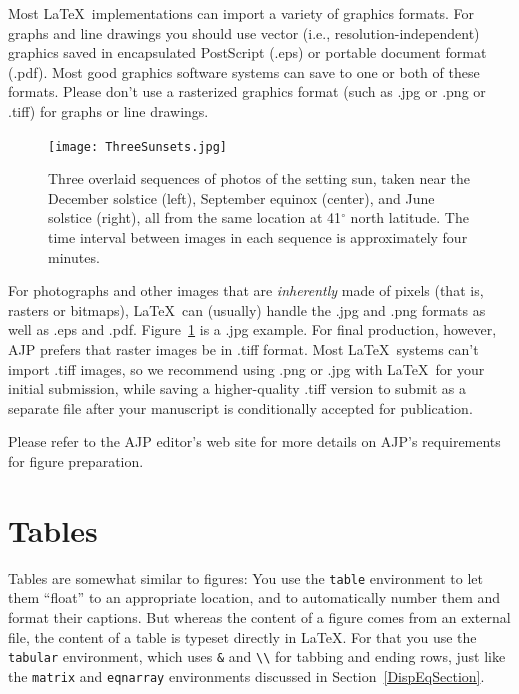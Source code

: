 \documentclass[prb,preprint]{revtex4-1}
\begin{document}
Most \LaTeX\ implementations can import a variety of graphics formats.
For graphs and line drawings you should use vector (i.e., resolution-independent)
graphics saved in encapsulated PostScript (.eps) or portable document
format (.pdf).  Most good graphics software systems can save to one 
or both of these formats.  Please don't use a rasterized graphics format
(such as .jpg or .png or .tiff) for graphs or line drawings.

\begin{figure}[h!]
\centering
\texttt{[image: ThreeSunsets.jpg]}
\caption{Three overlaid sequences of photos of the setting sun, taken
near the December solstice (left), September equinox (center), and
June solstice (right), all from the same location at 41$^\circ$ north
latitude. The time interval between images in each sequence is approximately
four minutes.}
\label{sunsets}
\end{figure}

For photographs and other images that are \textit{inherently} made 
of pixels (that is, rasters or bitmaps), \LaTeX\ can 
(usually) handle the .jpg and .png formats as well as .eps and .pdf.  
Figure~\ref{sunsets} is a .jpg example. For final production, however, 
AJP prefers that raster images be in .tiff format.  Most \LaTeX\ systems 
can't import .tiff images, so we recommend using .png or .jpg with \LaTeX\ 
for your initial submission, while saving a higher-quality .tiff version 
to submit as a separate file after your manuscript is conditionally accepted
for publication.

Please refer to the AJP editor's web site\cite{editorsite} for more details 
on AJP's requirements for figure preparation.


\section{Tables}

Tables are somewhat similar to figures:  You use the \texttt{table} environment
to let them ``float'' to an appropriate location, and to automatically number
them and format their captions.  But whereas the content of a figure comes
from an external file, the content of a table is typeset directly in \LaTeX.
For that you use the \texttt{tabular} environment, which uses \verb/&/ and
\verb/\\/ for tabbing and ending rows, just like the \texttt{matrix} and
\texttt{eqnarray} environments discussed in Section~\ref{DispEqSection}.
\end{document}
